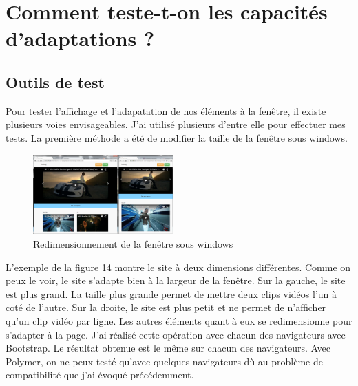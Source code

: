 \documentclass{article}
\begin{document}
\newpage
\section{Comment teste-t-on les capacit\'es d'adaptations ?}

\subsection{Outils de test}

\hspace*{0.6cm}Pour tester l'affichage et l'adapatation de nos \'el\'ements \`a la fen\^etre, il existe plusieurs voies envisageables. J'ai utilis\'e plusieurs d'entre elle pour effectuer mes tests. La premi\`ere m\'ethode a \'et\'e de modifier la taille de la fen\^etre sous windows.\\

\begin{figure}
  \vspace{-25pt}
  \begin{center}
    \includegraphics[width=0.48\textwidth]{double}
  \end{center}
  \vspace{-20pt}
  \caption{Redimensionnement de la fen\^etre sous windows}
  \vspace{-10pt}
\end{figure}

L'exemple de la figure 14 montre le site \`a deux dimensions diff\'erentes. Comme on peux le voir, le site s'adapte bien \`a la largeur de la fen\^etre. Sur la gauche, le site est plus grand. La taille plus grande permet de mettre deux clips vid\'eos l'un \`a cot\'e de l'autre. Sur la droite, le site est plus petit et ne permet de n'afficher qu'un clip vid\'eo par ligne. Les autres \'el\'ements quant \`a eux se redimensionne pour s'adapter \`a la page. J'ai r\'ealis\'e cette op\'eration avec chacun des navigateurs avec Bootstrap. Le r\'esultat obtenue est le m\^eme sur chacun des navigateurs. Avec Polymer, on ne peux test\'e qu'avec quelques navigateurs d\`u au probl\`eme de compatibilit\'e que j'ai \'evoqu\'e pr\'ec\'edemment.\\
\end{document}
